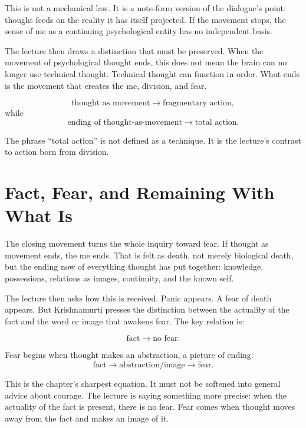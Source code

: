 This is not a mechanical law. It is a note-form version of the dialogue's point: thought feeds on the reality it has itself projected. If the movement stops, the sense of me as a continuing psychological entity has no independent basis.

The lecture then draws a distinction that must be preserved. When the movement of psychological thought ends, this does not mean the brain can no longer use technical thought. Technical thought can function in order. What ends is the movement that creates the me, division, and fear.

\begin{equation}
\text{thought as movement}
\longrightarrow
\text{fragmentary action},
\end{equation}
while
\begin{equation}
\text{ending of thought-as-movement}
\longrightarrow
\text{total action}.
\end{equation}

The phrase ``total action'' is not defined as a technique. It is the lecture's contrast to action born from division.

\section{Fact, Fear, and Remaining With What Is}

The closing movement turns the whole inquiry toward fear. If thought as movement ends, the me ends. That is felt as death, not merely biological death, but the ending now of everything thought has put together: knowledge, possessions, relations as images, continuity, and the known self.

The lecture then asks how this is received. Panic appears. A fear of death appears. But Krishnamurti presses the distinction between the actuality of the fact and the word or image that awakens fear. The key relation is:

\begin{equation}
\text{fact} \longrightarrow \text{no fear}.
\end{equation}

Fear begins when thought makes an abstraction, a picture of ending:
\begin{equation}
\text{fact}
\longrightarrow
\text{abstraction/image}
\longrightarrow
\text{fear}.
\end{equation}

This is the chapter's sharpest equation. It must not be softened into general advice about courage. The lecture is saying something more precise: when the actuality of the fact is present, there is no fear. Fear comes when thought moves away from the fact and makes an image of it.

